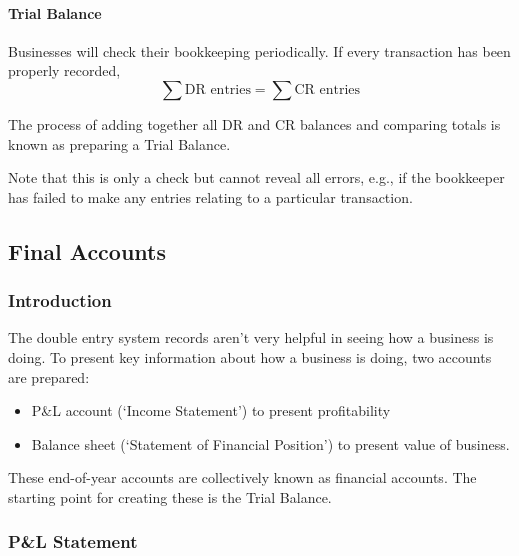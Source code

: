 \documentclass[
]{article}
\newenvironment{Shaded}{}{}
\newcommand{\NormalTok}[1]{#1}
\providecommand{\tightlist}{%
  \setlength{\itemsep}{0pt}\setlength{\parskip}{0pt}}
\begin{document}
\hypertarget{trial-balance}{%
\paragraph{Trial Balance}\label{trial-balance}}

Businesses will check their bookkeeping periodically. If every
transaction has been properly recorded,
\[\sum \text{DR entries} = \sum \text{CR entries}\]

\begin{Shaded}
\begin{Highlighting}[]
\NormalTok{The process of adding together all DR and CR balances and comparing totals is known as preparing a Trial Balance. }
\end{Highlighting}
\end{Shaded}

Note that this is only a check but cannot reveal all errors, e.g., if
the bookkeeper has failed to make any entries relating to a particular
transaction.

\hypertarget{final-accounts}{%
\subsection{Final Accounts}\label{final-accounts}}

\hypertarget{introduction-1}{%
\subsubsection{Introduction}\label{introduction-1}}

The double entry system records aren't very helpful in seeing how a
business is doing. To present key information about how a business is
doing, two accounts are prepared:

\begin{itemize}
\tightlist
\item
  P\&L account (`Income Statement') to present profitability
\item
  Balance sheet (`Statement of Financial Position') to present value of
  business.
\end{itemize}

These end-of-year accounts are collectively known as financial accounts.
The starting point for creating these is the Trial Balance.

\hypertarget{pl-statement}{%
\subsubsection{P\&L Statement}\label{pl-statement}}
\end{document}

